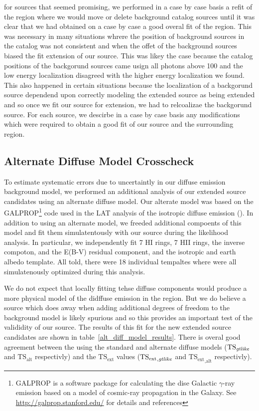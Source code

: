 \documentclass[12pt,preprint]{aastex}
\newcommand{\mev}{\text{MeV}\xspace}
\newcommand{\tsext}{{\ensuremath{\text{TS}_\text{ext}}}\xspace}
\newcommand{\tsextgtlike}{\ensuremath{\tsext_{,\gtlike}}\xspace}
\newcommand{\tsextalt}{\ensuremath{\tsext_{,\alt}}\xspace}
\newcommand{\ts}{\text{TS}\xspace}
\newcommand{\alt}{\text{alt}\xspace}
\newcommand{\gtlike}{\text{\em gtlike}\xspace}
\begin{document}
for sources that seemed promising, we performed in a case
by case basis a refit of the region where we would move or delete
background catalog sources until it was clear that we had obtained on
a case by case a good overal fit of the region. This was necessary in
many situations whrere the position of background sources in the catalog
was not consistent and when the offet of the background sources biased
the fit extension of our source. This was likey the case because the
catalog positions of the backgorund sources came usign all photons above
100 \mev and the low energy localization disagreed with the higher energy
localization we found. This also happened in certain situations because
the localization of a backgorund source dependend upon correctly modeling
the extended source as being extended and so once we fit our source for
extension, we had to relcoalizae the backgorund source.  For each source,
we descirbe in a case by case basis any modifications which were required
to obtain a good fit of our source and the surrounding region.

\subsection{Alternate Diffuse Model Crosscheck}
\label{alt_diff_model_description}

To estimate systematic errors due to uncertaintly in our diffuse
emission background model, we performed an additional analysis
of our extended source candidates using an alternate diffuse
model. Our alterate model was based on the GALPROP\footnote{GALPROP
is a software package for calculating the dise Galactic $\gamma$-ray
emission based on a model of cosmic-ray propagation in the Galaxy. See
\url{http://galprop.stanford.edu/} for details and references} code
used in the LAT analysis of the isotropic diffuse emission
(\cite{isotropic_lat}).  In addition to using an alternate model, we
freeded additional compoents of this model and fit them simulatentously
with our source during the likelihood analysis. In particular,
we independently fit 7 HI rings, 7 HII rings, the inverse compoton,
and the E(B-V) residual component, and the isotropic and earth albedo
template. All told, there were 18 individual tempaltes where were all
simulatenously optimized during this analysis.

We do not expect that locally fitting tehse diffuse components would
produce a more physical model of the didffuse emission in the region.
But we do believe a source which does away when adding additional
degrees of freedom to the background model is likely spurious and so
this provides an important test of the valididity of our source.
The results of this fit for the new extended source candidates are
shown in table~\ref{alt_diff_model_results}. There is overal
good agreement between the \ts using the standard and alternate diffuse
models ($\ts_\gtlike$ and $\ts_\alt$ respectivly) and the \tsext values
(\tsextgtlike and \tsextalt respectivly).
\end{document}
